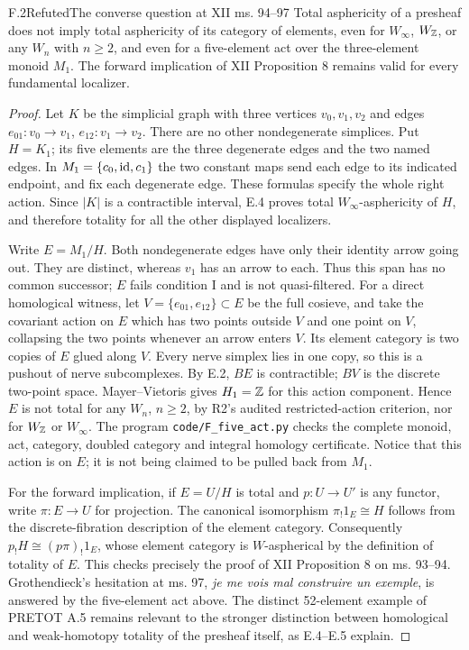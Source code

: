 \begin{claim}{F.2}{Refuted}{The converse question at XII ms. 94--97}
\label{F:presheaf-category}
Total asphericity of a presheaf does not imply total asphericity
of its category of elements, even for $W_\infty$, $W_{\mathbb Z}$, or
any $W_n$ with $n\geq2$, and even for a five-element act over
the three-element monoid $M_1$.
The forward implication of XII Proposition 8 remains valid for
every fundamental localizer.
\end{claim}
\begin{proof}
Let $K$ be the simplicial graph with three vertices $v_0,v_1,v_2$
and edges $e_{01}:v_0\to v_1$, $e_{12}:v_1\to v_2$.
There are no other nondegenerate simplices. Put $H=K_1$; its
five elements are the three degenerate edges and the two named
edges. In $M_1=\{c_0,\mathrm{id},c_1\}$ the two constant maps send each
edge to its indicated endpoint, and fix each degenerate edge.
These formulas specify the whole right action.
Since $|K|$ is a contractible interval, E.4 proves total
$W_\infty$-asphericity of $H$, and therefore totality for all
the other displayed localizers.

Write $E=M_1/H$. Both nondegenerate edges have only their
identity arrow going out. They are distinct, whereas $v_1$
has an arrow to each. Thus this span has no common successor;
$E$ fails condition I and is not quasi-filtered. For a direct
homological witness, let $V=\{e_{01},e_{12}\}\subset E$ be the
full cosieve, and take the covariant action on $E$ which has
two points outside $V$ and one point on $V$, collapsing the
two points whenever an arrow enters $V$. Its element category
is two copies of $E$ glued along $V$. Every nerve simplex lies
in one copy, so this is a pushout of nerve subcomplexes.
By E.2, $BE$ is contractible; $BV$ is the discrete two-point
space. Mayer--Vietoris gives $H_1=\mathbb Z$ for this action component.
Hence $E$ is not total for any $W_n$, $n\geq2$, by R2's
audited restricted-action criterion, nor for $W_{\mathbb Z}$ or
$W_\infty$. The program \texttt{code/F\_five\_act.py} checks
the complete monoid, act, category, doubled category and integral
homology certificate. Notice that this action is on $E$;
it is not being claimed to be pulled back from $M_1$.

For the forward implication, if $E=U/H$ is total and
$p:U\to U'$ is any functor, write $\pi:E\to U$ for projection.
The canonical isomorphism $\pi_!1_E\cong H$ follows from the
discrete-fibration description of the element category.
Consequently $p_!H\cong(p\pi)_!1_E$, whose element category
is $W$-aspherical by the definition of totality of $E$.
This checks precisely the proof of XII Proposition 8 on
ms. 93--94. Grothendieck's hesitation at ms. 97,
\emph{je me vois mal construire un exemple}, is answered by
the five-element act above. The distinct 52-element example
of PRETOT A.5 remains relevant to the stronger distinction
between homological and weak-homotopy totality of the presheaf
itself, as E.4--E.5 explain.
\end{proof}


